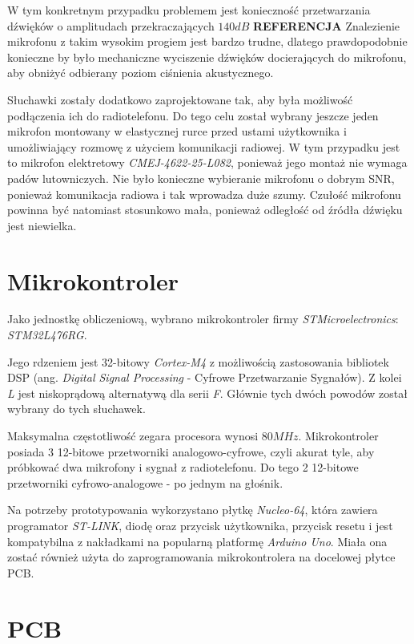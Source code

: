 W tym konkretnym przypadku problemem jest konieczność przetwarzania dźwięków o amplitudach przekraczających $140dB$
\textbf{REFERENCJA}
Znalezienie mikrofonu z takim wysokim progiem jest bardzo trudne, dlatego prawdopodobnie konieczne by było mechaniczne wyciszenie dźwięków docierających do mikrofonu, aby obniżyć odbierany poziom ciśnienia akustycznego.

Słuchawki zostały dodatkowo zaprojektowane tak, aby była możliwość podłączenia ich do radiotelefonu. Do tego celu został wybrany jeszcze jeden mikrofon montowany w elastycznej rurce przed ustami użytkownika i umożliwiający rozmowę z użyciem komunikacji radiowej. W tym przypadku jest to mikrofon elektretowy \textit{CMEJ-4622-25-L082}, ponieważ jego montaż nie wymaga padów lutowniczych. Nie było konieczne wybieranie mikrofonu o dobrym SNR, ponieważ komunikacja radiowa i tak wprowadza duże szumy. Czułość mikrofonu powinna być natomiast stosunkowo mała, ponieważ odległość od źródła dźwięku jest niewielka.


\section{Mikrokontroler}
\label{cha:uC}

Jako jednostkę obliczeniową, wybrano mikrokontroler firmy \textit{STMicroelectronics}: \textit{STM32L476RG}.

Jego rdzeniem jest 32-bitowy \textit{Cortex-M4} z możliwością zastosowania bibliotek DSP (ang. \textit{Digital Signal Processing} - Cyfrowe Przetwarzanie Sygnałów). Z kolei \textit{L} jest niskoprądową alternatywą dla serii \textit{F}. Głównie tych dwóch powodów został wybrany do tych słuchawek.

Maksymalna częstotliwość zegara procesora wynosi $80MHz$. Mikrokontroler posiada 3 12-bitowe przetworniki analogowo-cyfrowe, czyli akurat tyle, aby próbkować dwa mikrofony i sygnał z radiotelefonu. Do tego 2 12-bitowe przetworniki cyfrowo-analogowe - po jednym na głośnik\cite{STM32L4}.

Na potrzeby prototypowania wykorzystano płytkę \textit{Nucleo-64}, która zawiera programator \textit{ST-LINK}, diodę oraz przycisk użytkownika, przycisk resetu i jest kompatybilna z nakładkami na popularną platformę \textit{Arduino Uno}. Miała ona zostać również użyta do zaprogramowania mikrokontrolera na docelowej płytce PCB.


\section{PCB}
\label{cha:PCB}

